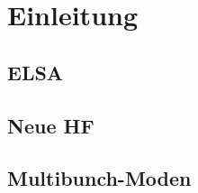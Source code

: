 \chapter{Einleitung}
\label{sec:einleitung}

\section{ELSA}

\section{Neue HF}
\cite{schedler}

\section{Multibunch-Moden}